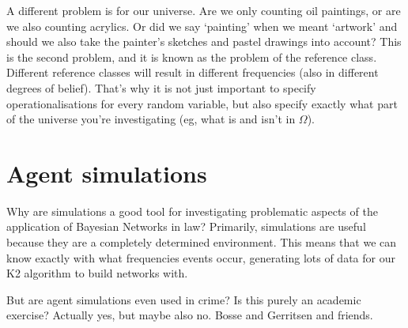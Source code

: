 A different problem is for our universe. Are we only counting oil paintings, or are we also counting acrylics. Or did we say `painting' when we meant `artwork' and should we also take the painter's sketches and pastel drawings into account? This is the second problem, and it is known as the problem of the reference class. Different reference classes will result in different frequencies (also in different degrees of belief). That's why it is not just important to specify operationalisations for every random variable, but also specify exactly what part of the universe you're investigating (eg, what is and isn't in $\Omega$).


\section{Agent simulations}
Why are simulations a good tool for investigating problematic aspects of the application of Bayesian Networks in law? Primarily, simulations are useful because they are a completely determined environment. This means that we can know exactly with what frequencies events occur, generating lots of data for our K2 algorithm to build networks with.

But are agent simulations even used in crime? Is this purely an academic exercise? Actually yes, but maybe also no.
Bosse and Gerritsen and friends.


 



